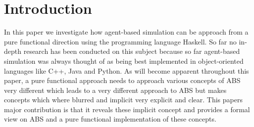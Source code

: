 \section{Introduction}
In this paper we investigate how agent-based simulation can be approach from a pure functional direction using the programming language Haskell. So far no in-depth research has been conducted on this subject because so far agent-based simulation was always thought of as being best implemented in object-oriented languages like C++, Java and Python. 
As will become apparent throughout this paper, a pure functional approach needs to approach various concepts of ABS very different which leads to a very different approach to ABS but makes concepts which where blurred and implicit very explicit and clear.
This papers major contribution is that it reveals these implicit concept and provides a formal view on ABS and a pure functional implementation of these concepts.